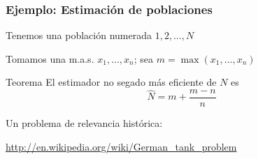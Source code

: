 \documentclass[12pt,t]{beamer}\usepackage[]{graphicx}\usepackage[]{color}
\theoremstyle{plain}
\theoremstyle{definition}
\begin{document}
\begin{frame}
\frametitle{Ejemplo: Estimación de poblaciones }

Tenemos una población numerada $1,2,\ldots,N$\medskip

Tomamos  una m.a.s. $x_1,\ldots,x_n$; sea
$m=\max(x_1,\ldots,x_n)$
\medskip

\begin{block}{Teorema}
El estimador no segado más eficiente de $N$ es
$$
\widehat{N}=m+\frac{m-n}{n}
$$
\end{block}
\bigskip


Un problema de relevancia histórica:

{\scriptsize \url{http://en.wikipedia.org/wiki/German_tank_problem}}

\end{frame}
\end{document}
